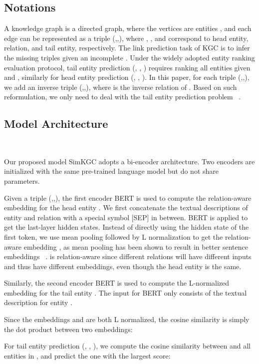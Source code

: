\documentclass[11pt]{article}
\begin{document}
\subsection{Notations}

A knowledge graph  is a directed graph,
where the vertices are entities ,
and each edge can be represented as a triple (,,),
where , , and  correspond to
head entity, relation, and tail entity, respectively.
The link prediction task of KGC is to infer the missing triples given an incomplete .
Under the widely adopted entity ranking evaluation protocol,
tail entity prediction (, , ) requires ranking all entities given  and ,
similarly for head entity prediction (, , ).
In this paper,
for each triple (,,),
we add an inverse triple (,,),
where  is the inverse relation of .
Based on such reformulation,
we only need to deal with the tail entity prediction problem ~\citep{Malaviya2020CommonsenseKB}.

\subsection{Model Architecture} ~\label{sec:arch}

Our proposed model SimKGC adopts a bi-encoder architecture.
Two encoders are initialized with the same pre-trained language model
but do not share parameters.

Given a triple (,,),
the first encoder BERT is used to compute
the relation-aware embedding for the head entity .
We first concatenate the textual descriptions of entity 
and relation  with a special symbol [SEP] in between.
BERT is applied to get the last-layer hidden states.
Instead of directly using the hidden state of the first token,
we use mean pooling followed by L normalization
to get the relation-aware embedding ,
as mean pooling has been shown to result in
better sentence embeddings ~\citep{gao2021simcse,Reimers2019SentenceBERTSE}.
 is relation-aware
since different relations will have different inputs
and thus have different embeddings,
even though the head entity is the same.

Similarly,
the second encoder BERT is used to
compute the L-normalized embedding  for the tail entity .
The input for BERT only consists of the textual description for entity .

Since the embeddings  and  are both L normalized,
the cosine similarity 
is simply the dot product between two embeddings:


For tail entity prediction (, , ),
we compute the cosine similarity between 
and all entities in ,
and predict the one with the largest score:
\end{document}
